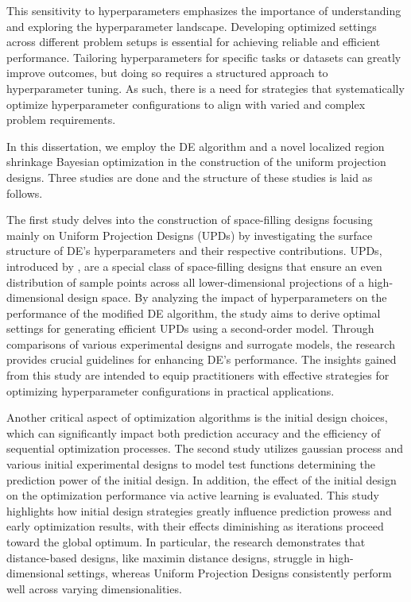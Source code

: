 This sensitivity to hyperparameters emphasizes the importance of understanding and exploring the hyperparameter landscape. Developing optimized settings across different problem setups is essential for achieving reliable and efficient performance. Tailoring hyperparameters for specific tasks or datasets can greatly improve outcomes, but doing so requires a structured approach to hyperparameter tuning. As such, there is a need for strategies that systematically optimize hyperparameter configurations to align with varied and complex problem requirements. 


In this dissertation, we employ the DE algorithm and a novel localized region shrinkage Bayesian optimization in the construction of the uniform projection designs. Three studies are done and the structure of these studies is laid as follows.

The first study delves into the construction of space-filling designs focusing mainly on Uniform Projection Designs (UPDs) by investigating the surface structure of DE's hyperparameters and their respective contributions. {UPDs, introduced by \textcite{sun2019uniform}, are a special class of space-filling designs} that ensure an even distribution of sample points across all lower-dimensional projections of a high-dimensional design space. By analyzing the impact of hyperparameters on the performance of the modified DE algorithm, the study aims to derive optimal settings for generating {efficient UPDs} using a second-order model. Through comparisons of various experimental designs and surrogate models, the research provides crucial guidelines for enhancing DE's performance. The insights gained from this study are intended to equip practitioners with effective strategies for optimizing hyperparameter configurations in practical applications.

Another critical aspect of optimization algorithms is the initial design choices, which can significantly impact both prediction accuracy and the efficiency of sequential optimization processes. The second study utilizes gaussian process and various initial experimental designs to model test functions determining the prediction power of the initial design. In addition, {the effect of the initial design on the optimization performance via active learning}  is evaluated. This study highlights how initial design strategies greatly influence prediction prowess and early optimization results, with their effects diminishing as iterations proceed toward the global optimum. In particular, the research demonstrates that distance-based designs, like {maximin distance designs}, struggle in high-dimensional settings, whereas Uniform Projection Designs consistently perform well across varying dimensionalities.

